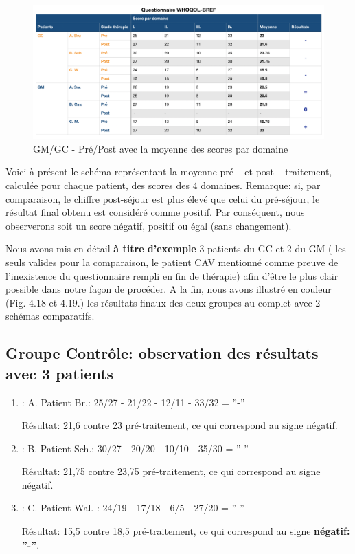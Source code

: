 \begin{figure}
\centering
\includegraphics[width=\linewidth]{images/graphiques/questionnaire_wq.png}
\caption[Questionnaire WHOQOL-BREF]{GM/GC - Pré/Post avec la moyenne des scores par domaine}

\end{figure}
Voici à présent le schéma représentant la
moyenne pré -- et post -- traitement, calculée pour chaque patient, des scores
des 4 domaines.
Remarque: si, par comparaison, le chiffre post-séjour est plus élevé
que celui du
pré-séjour, le résultat final obtenu est considéré comme
positif. Par conséquent, nous
observerons soit un score négatif, positif ou égal (sans changement).


Nous avons mis en détail  \textbf{à titre d'exemple } 3 patients du GC et 2 du GM
( les seuls valides pour la comparaison, le patient CAV mentionné comme preuve de l'inexistence du questionnaire rempli en fin de thérapie) afin d'être le plus clair possible
dans notre façon de procéder.
A la fin, nous avons illustré en couleur (Fig. 4.18 et 4.19.) les
résultats finaux des deux groupes au complet avec 2 schémas
comparatifs.
\subsection{Groupe Contrôle: observation des résultats avec 3 patients}

\begin{enumerate}
\item : A. Patient Br.:  25/27 - 21/22 - 12/11 - 33/32 =  ''-''

          Résultat: 21,6 contre 23 pré-traitement,  ce qui
        correspond au signe négatif.
      \item : B. Patient Sch.: 30/27 - 20/20 -  10/10 - 35/30 = ''-''

         Résultat: 21,75 contre 23,75 pré-traitement, ce qui
        correspond au signe négatif.

 		\item :  C. Patient Wal. : 24/19 -  17/18 - 6/5 -
                  27/20 =  ''-''

                  Résultat: 15,5 contre 18,5 pré-traitement, ce qui
        correspond au signe \textbf{négatif: ''-''}.
 	\end{enumerate}


